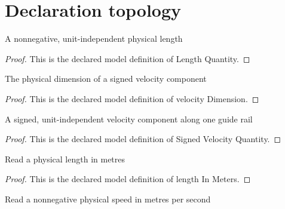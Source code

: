 \section{Declaration topology}
\begin{definition}
  \label{def:physics:phyx-mini-0673:phyxminiproblems-problemphyxmini0673-lengthquantity}
  A nonnegative, unit-independent physical length
\end{definition}
\begin{proof}
  This is the declared model definition of Length Quantity.
\end{proof}
\begin{definition}
  \label{def:physics:phyx-mini-0673:phyxminiproblems-problemphyxmini0673-velocitydimension}
  The physical dimension of a signed velocity component
\end{definition}
\begin{proof}
  This is the declared model definition of velocity Dimension.
\end{proof}
\begin{definition}
  \label{def:physics:phyx-mini-0673:phyxminiproblems-problemphyxmini0673-signedvelocityquantity}
  A signed, unit-independent velocity component along one guide rail
\end{definition}
\begin{proof}
  This is the declared model definition of Signed Velocity Quantity.
\end{proof}
\begin{definition}
  \label{def:physics:phyx-mini-0673:phyxminiproblems-problemphyxmini0673-lengthinmeters}
  Read a physical length in metres
\end{definition}
\begin{proof}
  This is the declared model definition of length In Meters.
\end{proof}
\begin{definition}
  \label{def:physics:phyx-mini-0673:phyxminiproblems-problemphyxmini0673-speedinmeterspersecond}
  Read a nonnegative physical speed in metres per second
\end{definition}
